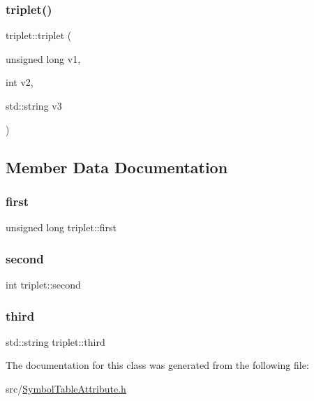 \mbox{\label{classtriplet_ab2d03159a2e99fee8d621dddec481d66}} 
\subsubsection{\texorpdfstring{triplet()}{triplet()}\hspace{0.1cm}{\footnotesize\ttfamily [2/2]}}
{\footnotesize\ttfamily triplet\+::triplet (\begin{DoxyParamCaption}\item[{unsigned long}]{v1,  }\item[{int}]{v2,  }\item[{std\+::string}]{v3 }\end{DoxyParamCaption})\hspace{0.3cm}{\ttfamily [inline]}}



\subsection{Member Data Documentation}
\mbox{\label{classtriplet_a3af8f9c37ea8230ec41a2e576f31cacd}} 
\subsubsection{\texorpdfstring{first}{first}}
{\footnotesize\ttfamily unsigned long triplet\+::first}

\mbox{\label{classtriplet_ae2f96f25885f90f2668d142b31e9dac4}} 
\subsubsection{\texorpdfstring{second}{second}}
{\footnotesize\ttfamily int triplet\+::second}

\mbox{\label{classtriplet_ab4d72eb35d165043734c7e870c01677f}} 
\subsubsection{\texorpdfstring{third}{third}}
{\footnotesize\ttfamily std\+::string triplet\+::third}



The documentation for this class was generated from the following file\+:\begin{DoxyCompactItemize}
\item 
src/\hyperlink{SymbolTableAttribute_8h}{Symbol\+Table\+Attribute.\+h}\end{DoxyCompactItemize}
